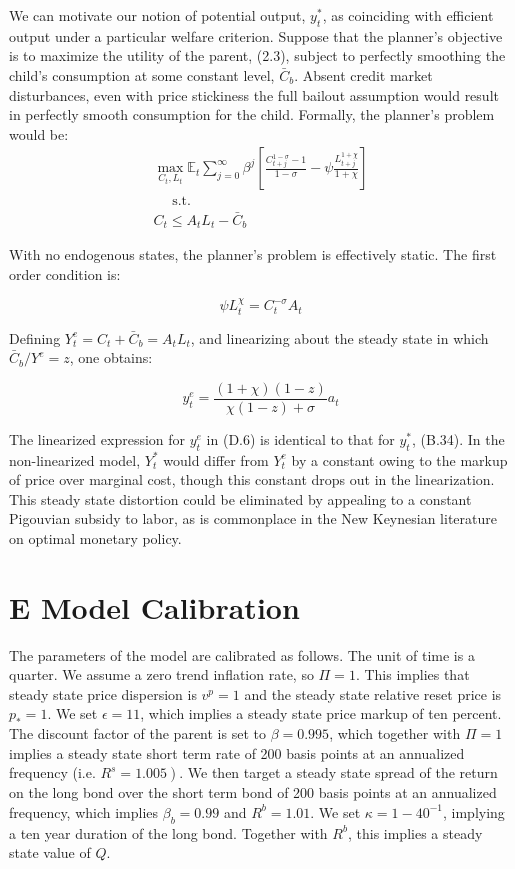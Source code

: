\documentclass[10pt]{article}
\begin{document}
We can motivate our notion of potential output, $y_{t}^{*}$, as coinciding with efficient output under a particular welfare criterion. Suppose that the planner's objective is to maximize the utility of the parent, (2.3), subject to perfectly smoothing the child's consumption at some constant level, $\bar{C}_{b}$. Absent credit market disturbances, even with price stickiness the full bailout assumption would result in perfectly smooth consumption for the child. Formally, the planner's problem would be:\\
\begin{gather*}
\max _{C_{t}, L_{t}} \mathbb{E}_{t} \sum_{j=0}^{\infty} \beta^{j}\left[\frac{C_{t+j}^{1-\sigma}-1}{1-\sigma}-\psi \frac{L_{t+j}^{1+\chi}}{1+\chi}\right]  \tag{D.3}\\
\quad \text { s.t. } \\
C_{t} \leq A_{t} L_{t}-\bar{C}_{b} \tag{D.4}
\end{gather*}

With no endogenous states, the planner's problem is effectively static. The first order condition is:

\begin{equation*}
\psi L_{t}^{\chi}=C_{t}^{-\sigma} A_{t} \tag{D.5}
\end{equation*}

Defining $Y_{t}^{e}=C_{t}+\bar{C}_{b}=A_{t} L_{t}$, and linearizing about the steady state in which $\bar{C}_{b} / Y^{e}=z$, one obtains:

\begin{equation*}
y_{t}^{e}=\frac{(1+\chi)(1-z)}{\chi(1-z)+\sigma} a_{t} \tag{D.6}
\end{equation*}

The linearized expression for $y_{t}^{e}$ in (D.6) is identical to that for $y_{t}^{*}$, (B.34). In the non-linearized model, $Y_{t}^{*}$ would differ from $Y_{t}^{e}$ by a constant owing to the markup of price over marginal cost, though this constant drops out in the linearization. This steady state distortion could be eliminated by appealing to a constant Pigouvian subsidy to labor, as is commonplace in the New Keynesian literature on optimal monetary policy.

\section*{E Model Calibration}
The parameters of the model are calibrated as follows. The unit of time is a quarter. We assume a zero trend inflation rate, so $\Pi=1$. This implies that steady state price dispersion is $v^{p}=1$ and the steady state relative reset price is $p_{*}=1$. We set $\epsilon=11$, which implies a steady state price markup of ten percent. The discount factor of the parent is set to $\beta=0.995$, which together with $\Pi=1$ implies a steady state short term rate of 200 basis points at an annualized frequency (i.e. $\left.R^{s}=1.005\right)$. We then target a steady state spread of the return on the long bond over the short term bond of 200 basis points at an annualized frequency, which implies $\beta_{b}=0.99$ and $R^{b}=1.01$. We set $\kappa=1-40^{-1}$, implying a ten year duration of the long bond. Together with $R^{b}$, this implies a steady state value of $Q$.
\end{document}
